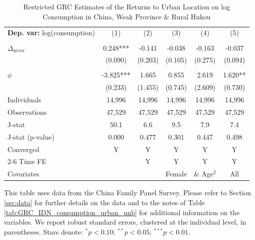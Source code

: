 \begin{table}[htbp] \centering \begin{threeparttable}
 \caption{Restricted GRC Estimates of the Returns to Urban Location on log Consumption in China, Weak Province & Rural Hukou} 
 \label{tab:GRC_CHN_w_rur_consumption_urban_unb} 
\begin{tabular}{l ccccc} \toprule  \textbf{Dep. var:}  log(consumption) 
                    &\multicolumn{1}{c}{(1)}   &\multicolumn{1}{c}{(2)}   &\multicolumn{1}{c}{(3)}   &\multicolumn{1}{c}{(4)}   &\multicolumn{1}{c}{(5)}   \\
                    &               &               &               &               &               \\
\addlinespace
$\Delta_{\text{never}}$&       0.248***&      -0.141   &      -0.038   &      -0.163   &      -0.037   \\
                    &     (0.090)   &     (0.203)   &     (0.105)   &     (0.275)   &     (0.094)   \\
                    &               &               &               &               &               \\
\addlinespace
$\phi$              &      -3.825***&       1.665   &       0.855   &       2.619   &       1.620** \\
                    &     (0.233)   &     (1.455)   &     (0.745)   &     (2.609)   &     (0.730)   \\
\addlinespace
Individuals         &      14,996   &      14,996   &      14,996   &      14,996   &      14,996   \\
Observations        &      47,529   &      47,529   &      47,529   &      47,529   &      47,529   \\
J-stat              &        50.1   &         6.6   &         9.5   &         7.9   &         7.4   \\
J-stat (p-value)    &       0.000   &       0.477   &       0.301   &       0.447   &       0.498   \\
Converged           &           Y   &           Y   &           Y   &           Y   &           Y   \\
\cmidrule{2-6} Time FE & & Y & Y & Y & Y \\ Covariates & & & Female & \& Age$^2$ & All \\ \bottomrule \end{tabular} \begin{tablenotes}[flushleft] \footnotesize \item{This table uses data from the China Family Panel Survey. Please refer to Section \ref{sec:data} for further details on the data and to the notes of Table \ref{tab:GRC_IDN_consumption_urban_unb} for additional information on the variables. We report robust standard errors, clustered at the individual level, in parentheses. Stars denote: $^{*} p<0.10$; $^{**} p<0.05$; $^{***} p<0.01$.} \end{tablenotes} \end{threeparttable} \end{table}
